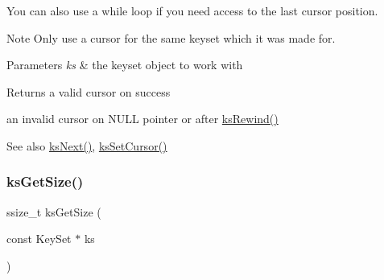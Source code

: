  You can also use a while loop if you need access to the last cursor position.


 \begin{DoxyNote}{Note}
Only use a cursor for the same keyset which it was made for.
\end{DoxyNote}

\begin{DoxyParams}{Parameters}
{\em ks} & the keyset object to work with \\
\hline
\end{DoxyParams}
\begin{DoxyReturn}{Returns}
a valid cursor on success 

an invalid cursor on N\+U\+LL pointer or after \hyperlink{group__keyset_gabe793ff51f1728e3429c84a8a9086b70}{ks\+Rewind()} 
\end{DoxyReturn}
\begin{DoxySeeAlso}{See also}
\hyperlink{group__keyset_ga317321c9065b5a4b3e33fe1c399bcec9}{ks\+Next()}, \hyperlink{group__keyset_ga28b2a7d13c620b3c9d4815a0608c738f}{ks\+Set\+Cursor()} 
\end{DoxySeeAlso}
\mbox{\label{group__keyset_ga7474ad6b0a0fa969dbdf267ba5770eee}} 
\subsubsection{\texorpdfstring{ks\+Get\+Size()}{ksGetSize()}}
{\footnotesize\ttfamily ssize\+\_\+t ks\+Get\+Size (\begin{DoxyParamCaption}\item[{const Key\+Set $\ast$}]{ks }\end{DoxyParamCaption})}



